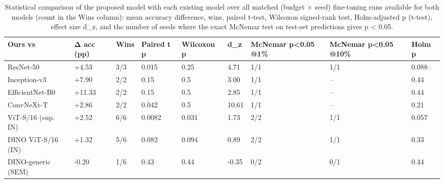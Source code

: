 \begin{table}
\caption{Statistical comparison of the proposed model with each existing model over all matched (budget × seed) fine-tuning runs available for both models (count in the Wins column): mean accuracy difference, wins, paired t-test, Wilcoxon signed-rank test, Holm-adjusted p (t-test), effect size d_z, and the number of seeds where the exact McNemar test on test-set predictions gives p < 0.05.}
\label{tab:t4_stats}
\begin{tabular}{lllllllll}
\toprule
Ours vs & Δ acc (pp) & Wins & Paired t p & Wilcoxon p & d\_z & McNemar p<0.05 @1\% & McNemar p<0.05 @10\% & Holm p \\
\midrule
ResNet-50 & +4.53 & 3/3 & 0.015 & 0.25 & 4.71 & 1/1 & 1/1 & 0.088 \\
Inception-v3 & +7.90 & 2/2 & 0.15 & 0.5 & 3.00 & 1/1 & – & 0.44 \\
EfficientNet-B0 & +11.33 & 2/2 & 0.15 & 0.5 & 2.85 & 1/1 & – & 0.44 \\
ConvNeXt-T & +2.86 & 2/2 & 0.042 & 0.5 & 10.61 & 1/1 & – & 0.21 \\
ViT-S/16 (sup. IN) & +2.52 & 6/6 & 0.0082 & 0.031 & 1.73 & 2/2 & 1/1 & 0.057 \\
DINO ViT-S/16 (IN) & +1.32 & 5/6 & 0.082 & 0.094 & 0.89 & 2/2 & 1/1 & 0.33 \\
DINO-generic (SEM) & -0.20 & 1/6 & 0.43 & 0.44 & -0.35 & 0/2 & 0/1 & 0.44 \\
\bottomrule
\end{tabular}
\end{table}
